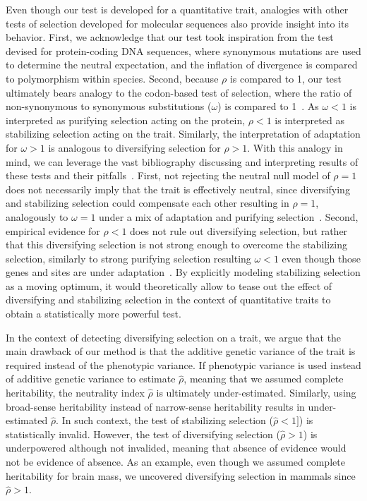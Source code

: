 \documentclass{article}
\newcommand{\dnds}{\omega}
\newcommand{\NI}{\rho}
\newcommand{\EstNI}{\widehat{\rho}}
\begin{document}
Even though our test is developed for a quantitative trait, analogies with other tests of selection developed for molecular sequences also provide insight into its behavior.
First, we acknowledge that our test took inspiration from the \textcite{mcdonald_adaptative_1991} test devised for protein-coding DNA sequences, where synonymous mutations are used to determine the neutral expectation, and the inflation of divergence is compared to polymorphism within species.
Second, because $\NI$ is compared to 1, our test ultimately bears analogy to the codon-based test of selection, where the ratio of non-synonymous to synonymous substitutions ($\dnds$) is compared to 1~\parencite{goldman_codonbased_1994, muse_likelihood_1994}.
As $\dnds < 1$ is interpreted as purifying selection acting on the protein, $\NI < 1$ is interpreted as stabilizing selection acting on the trait.
Similarly, the interpretation of adaptation for $\dnds > 1$ is analogous to diversifying selection for $\NI > 1$.
With this analogy in mind, we can leverage the vast bibliography discussing and interpreting results of these tests and their pitfalls~\parencite{nielsen_molecular_2005, anisimova_investigating_2009, jensen_importance_2019}.
First, not rejecting the neutral null model of $\NI = 1$ does not necessarily imply that the trait is effectively neutral, since diversifying and stabilizing selection could compensate each other resulting in $\NI = 1$, analogously to $\dnds=1$ under a mix of adaptation and purifying selection~\parencite{nielsen_molecular_2005}.
Second, empirical evidence for $\NI < 1$ does not rule out diversifying selection, but rather that this diversifying selection is not strong enough to overcome the stabilizing selection, similarly to strong purifying selection resulting $\dnds < 1$ even though those genes and sites are under adaptation~\parencite{latrille_genes_2023}.
By explicitly modeling stabilizing selection as a moving optimum, it would theoretically allow to tease out the effect of diversifying and stabilizing selection in the context of quantitative traits to obtain a statistically more powerful test.

In the context of detecting diversifying selection on a trait, we argue that the main drawback of our method is that the additive genetic variance of the trait is required instead of the phenotypic variance.
If phenotypic variance is used instead of additive genetic variance to estimate $\EstNI$, meaning that we assumed complete heritability, the neutrality index $\EstNI$ is ultimately under-estimated.
Similarly, using broad-sense heritability instead of narrow-sense heritability results in under-estimated $\EstNI$.
In such context, the test of stabilizing selection ($\EstNI < 1]$) is statistically invalid.
However, the test of diversifying selection ($\EstNI > 1$) is underpowered although not invalided, meaning that absence of evidence would not be evidence of absence.
As an example, even though we assumed complete heritability for brain mass, we uncovered diversifying selection in mammals since $\EstNI > 1$.
\end{document}
